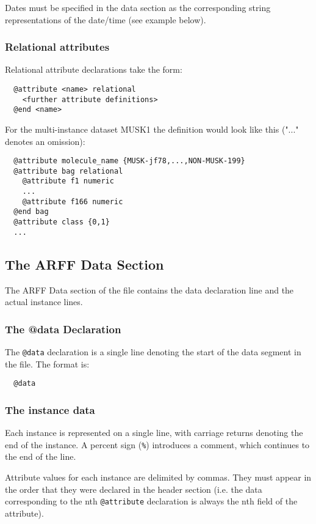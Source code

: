 Dates must be specified in the data section as the corresponding string representations of the date/time (see example below). 

\subsubsection*{Relational attributes}
Relational attribute declarations take the form:

\begin{verbatim}
  @attribute <name> relational
    <further attribute definitions>
  @end <name>
\end{verbatim}

\noindent For the multi-instance dataset MUSK1 the definition would look like this ("..." denotes an omission):

\begin{verbatim}
  @attribute molecule_name {MUSK-jf78,...,NON-MUSK-199}
  @attribute bag relational
    @attribute f1 numeric
    ...
    @attribute f166 numeric
  @end bag
  @attribute class {0,1}
  ...
\end{verbatim}


\subsection{The ARFF Data Section}
The ARFF Data section of the file contains the data declaration line and the actual instance lines.


\subsubsection*{The @data Declaration}
The \texttt{@data} declaration is a single line denoting the start of the data segment in the file. The format is:

\begin{verbatim}
  @data
\end{verbatim}


\subsubsection*{The instance data}
Each instance is represented on a single line, with carriage returns denoting the end of the instance. A percent sign (\texttt{\%}) introduces a comment, which continues to the end of the line.

Attribute values for each instance are delimited by commas. They must appear in the order that they were declared in the header section (i.e. the data corresponding to the nth \texttt{@attribute} declaration is always the nth field of the attribute).

